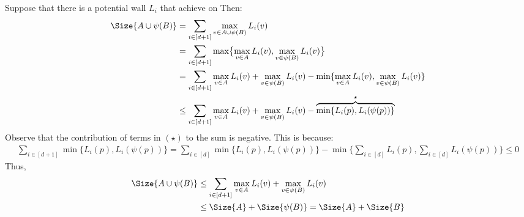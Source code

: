 Suppose that there is a potential wall $L_{i}$ that achieve on
  Then:
  \begin{equation*}
    \begin{split}
      \Size{A\cup \psi(B)} &= \sum_{i \in [d+1]}\max_{v \in A\cup \psi(B)} L_{i}(v) \\
      & =  \sum_{ i \in [d+1]} \max \bigl\{ \max_{v \in A } L_{i}(v) , \max_{v \in \psi(B) } L_{i}(v) \bigr\}  \\
      & =  \sum_{ i \in [d+1]}  \max_{v \in A } L_{i}(v) + \max_{v \in \psi(B) } L_{i}(v) -  \min \{   \max_{v \in A } L_{i}(v), \max_{v \in \psi(B) } L_{i}(v) \} \\
      & \le  \sum_{ i \in [d+1]}  \max_{v \in A } L_{i}(v) + \max_{v \in \psi(B) } L_{i}(v) -   \overbrace{\min \{  L_{i}(p),  L_{i}(\psi(p)) \} }^{ \star  } 
        \end{split}
      \end{equation*}
Observe that the contribution of terms in $(\star)$ to the sum is negative. This is because:
\begin{equation*}
  \begin{split}
    \sum_{i \in [d+1]}\min \{  L_{i}(p),  L_{i}(\psi(p)) \} = \sum_{i \in [d]}\min \{  L_{i}(p),  L_{i}(\psi(p)) \} - \min \big\{ \sum_{i \in [d]} L_{i}(p),\sum_{i \in [d]} L_{i}(\psi(p))\big\} \le 0
  \end{split}
\end{equation*}
Thus,  
      \begin{equation*}
        \begin{split}
      \Size{A\cup \psi(B)} & \le  \sum_{ i \in [d+1]}  \max_{v \in A } L_{i}(v) + \max_{v \in \psi(B) } L_{i}(v)  \\
      & \le \Size{A} + \Size{\psi(B)}  =  \Size{A} + \Size{B} 
    \end{split}
  \end{equation*}

